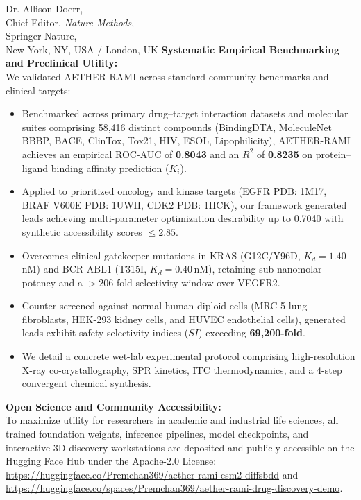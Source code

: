 \documentclass[11pt]{letter}
\begin{document}
\begin{letter}{%
    Dr. Allison Doerr,\\
    Chief Editor, \textit{Nature Methods},\\
    Springer Nature,\\
    New York, NY, USA / London, UK
}
\textbf{Systematic Empirical Benchmarking and Preclinical Utility:}\\
We validated AETHER-RAMI across standard community benchmarks and clinical targets:
\begin{itemize}
    \item Benchmarked across primary drug--target interaction datasets and molecular suites comprising 58,416 distinct compounds (BindingDTA, MoleculeNet BBBP, BACE, ClinTox, Tox21, HIV, ESOL, Lipophilicity), AETHER-RAMI achieves an empirical ROC-AUC of \textbf{0.8043} and an $R^2$ of \textbf{0.8235} on protein--ligand binding affinity prediction ($K_i$).
    \item Applied to prioritized oncology and kinase targets (EGFR PDB: 1M17, BRAF V600E PDB: 1UWH, CDK2 PDB: 1HCK), our framework generated leads achieving multi-parameter optimization desirability up to 0.7040 with synthetic accessibility scores $\le 2.85$.
    \item Overcomes clinical gatekeeper mutations in KRAS (G12C/Y96D, $K_d = 1.40$\,nM) and BCR-ABL1 (T315I, $K_d = 0.40$\,nM), retaining sub-nanomolar potency and a $>206$-fold selectivity window over VEGFR2.
    \item Counter-screened against normal human diploid cells (MRC-5 lung fibroblasts, HEK-293 kidney cells, and HUVEC endothelial cells), generated leads exhibit safety selectivity indices ($SI$) exceeding \textbf{69,200-fold}.
    \item We detail a concrete wet-lab experimental protocol comprising high-resolution X-ray co-crystallography, SPR kinetics, ITC thermodynamics, and a 4-step convergent chemical synthesis.
\end{itemize}

\textbf{Open Science and Community Accessibility:}\\
To maximize utility for researchers in academic and industrial life sciences, all trained foundation weights, inference pipelines, model checkpoints, and interactive 3D discovery workstations are deposited and publicly accessible on the Hugging Face Hub under the Apache-2.0 License: \url{https://huggingface.co/Premchan369/aether-rami-esm2-diffsbdd} and \url{https://huggingface.co/spaces/Premchan369/aether-rami-drug-discovery-demo}.


\end{letter}
\end{document}
